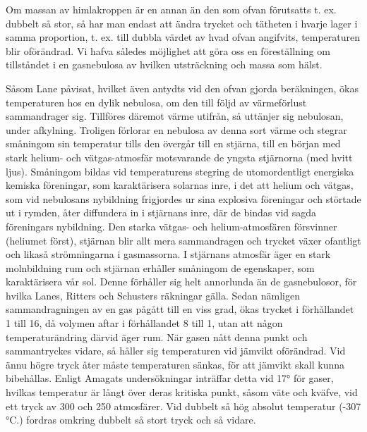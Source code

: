 \documentclass[a4paper, 12pt, oneside, swedish]{article}
\begin{document}
Om massan av himlakroppen är en annan än den som ofvan förutsatts t. ex. dubbelt så stor, så har man endast att ändra trycket och tätheten i hvarje lager i samma proportion, t. ex. till dubbla värdet av hvad ofvan angifvits, temperaturen blir oförändrad. Vi hafva således möjlighet att göra oss en föreställning om tillståndet i en gasnebulosa av hvilken utsträckning och massa som hälst.

Såsom Lane påvisat, hvilket även antydts vid den ofvan gjorda beräkningen, ökas temperaturen hos en dylik nebulosa, om den till följd av värmeförlust sammandrager sig. Tillföres däremot värme utifrån, så uttänjer sig nebulosan, under afkylning. Troligen förlorar en nebulosa av denna sort värme och stegrar småningom sin temperatur tills den övergår till en stjärna, till en början med stark helium- och vätgas-atmosfär motsvarande de yngsta stjärnorna (med hvitt ljus). Småningom bildas vid temperaturens stegring de utomordentligt energiska kemiska föreningar, som karaktärisera solarnas inre, i det att helium och vätgas, som vid nebulosans nybildning frigjordes ur sina explosiva föreningar och störtade ut i rymden, åter diffundera in i stjärnans inre, där de bindas vid sagda föreningars nybildning. Den starka vätgas- och helium-atmosfären försvinner (heliumet först), stjärnan blir allt mera sammandragen och trycket växer ofantligt och likaså strömningarna i gasmassorna. I stjärnans atmosfär äger en stark molnbildning rum och stjärnan erhåller småningom de egenskaper, som karaktärisera vår sol. Denne förhåller sig helt annorlunda än de gasnebulosor, för hvilka Lanes, Ritters och Schusters räkningar gälla. Sedan nämligen sammandragningen av en gas pågått till en viss grad, ökas trycket i förhållandet 1 till 16, då volymen aftar i förhållandet 8 till 1, utan att någon temperaturändring därvid äger rum. När gasen nått denna punkt och sammantryckes vidare, så håller sig temperaturen vid jämvikt oförändrad. Vid ännu högre tryck åter måste temperaturen sänkas, för att jämvikt skall kunna bibehållas. Enligt Amagats undersökningar inträffar detta vid 17° för gaser, hvilkas temperatur är långt över deras kritiska punkt, såsom väte och kväfve, vid ett tryck av 300 och 250 atmosfärer. Vid dubbelt så hög absolut temperatur (-307 °C.) fordras omkring dubbelt så stort tryck och så vidare.
\end{document}
